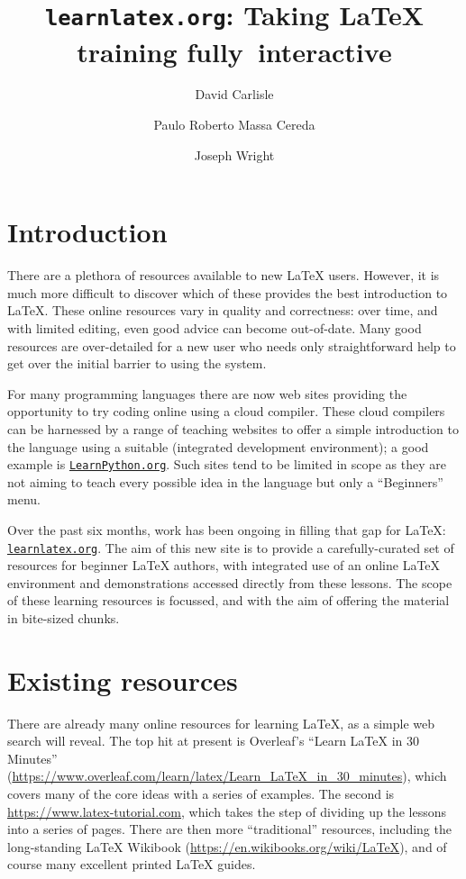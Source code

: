 \documentclass[final]{ltugboat}
\title{\texttt{learnlatex.org}: Taking \LaTeX{} training fully~interactive}
\author{David Carlisle}
\author{Paulo Roberto Massa Cereda}
\author{Joseph Wright}
\begin{document}
\maketitle

\section{Introduction}

There are a plethora of resources available to new \LaTeX{} users. However, it
is much more difficult to discover which of these provides the best
introduction to \LaTeX{}. These online resources vary in quality and correctness:
over time, and with limited editing, even good advice can become out-of-date.
Many good resources are over-detailed for a new user who needs only
straightforward help to get over the initial barrier to using the system.

For many programming languages there are now web sites providing the
opportunity to try coding online using a cloud compiler. These cloud compilers
can be harnessed by a range of teaching websites to offer a simple introduction
to the language using a suitable  (integrated development
environment); a good example is \href{https://LearnPython.org}{\nolinkurl{LearnPython.org}}. Such sites tend to be
limited in scope as they are not aiming to teach every possible idea in the
language but only a \enquote{Beginners} menu.

Over the past six months, work has been ongoing in filling that gap for
\LaTeX{}: \href{https://learnlatex.org}{\nolinkurl{learnlatex.org}}. The aim of this new site is to provide a
carefully-curated set of resources for beginner \LaTeX{} authors, with integrated
use of an online \LaTeX{} environment and demonstrations accessed directly from
these lessons. The scope of these learning resources is focussed, and with the
aim of offering the material in bite-sized chunks.

\section{Existing resources}

There are already many online resources for learning \LaTeX{}, as a simple web
search will reveal. The top hit at present is Overleaf's \enquote{Learn
\LaTeX{} in 30 Minutes}
(\url{https://www.overleaf.com/learn/latex/Learn_LaTeX_in_30_minutes}), which
covers many of the core ideas with a series of examples. The second is
\url{https://www.latex-tutorial.com}, which takes the step of dividing up the
lessons into a series of pages. There are then more \enquote{traditional}
resources, including the long-standing \LaTeX{} Wikibook
(\url{https://en.wikibooks.org/wiki/LaTeX}), and of course many excellent
printed \LaTeX{} guides.
\end{document}
